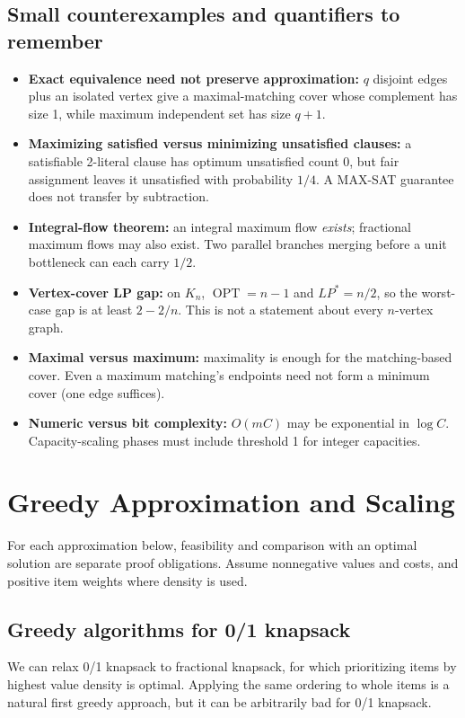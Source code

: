\documentclass[10pt]{article}
\theoremstyle{definition}
\newcommand{\OPT}{\operatorname{OPT}}
\begin{document}
\subsection{Small counterexamples and quantifiers to remember}
\begin{itemize}
\item \textbf{Exact equivalence need not preserve approximation:} $q$ disjoint edges plus
an isolated vertex give a maximal-matching cover whose complement has size 1, while
maximum independent set has size $q+1$.
\item \textbf{Maximizing satisfied versus minimizing unsatisfied clauses:} a satisfiable
2-literal clause has optimum unsatisfied count 0, but fair assignment leaves it unsatisfied
with probability $1/4$. A MAX-SAT guarantee does not transfer by subtraction.
\item \textbf{Integral-flow theorem:} an integral maximum flow \emph{exists}; fractional
maximum flows may also exist. Two parallel branches merging before a unit bottleneck can
each carry $1/2$.
\item \textbf{Vertex-cover LP gap:} on $K_n$, $\OPT=n-1$ and $LP^*=n/2$, so the
worst-case gap is at least $2-2/n$. This is not a statement about every $n$-vertex graph.
\item \textbf{Maximal versus maximum:} maximality is enough for the matching-based cover.
Even a maximum matching's endpoints need not form a minimum cover (one edge suffices).
\item \textbf{Numeric versus bit complexity:} $O(mC)$ may be exponential in $\log C$.
Capacity-scaling phases must include threshold 1 for integer capacities.
\end{itemize}



\clearpage\section{Greedy Approximation and Scaling}\label{gre:main}
For each approximation below, feasibility and comparison with an optimal solution are separate proof obligations. Assume nonnegative values and costs, and positive item weights where density is used.

\subsection{Greedy algorithms for 0/1 knapsack}\label{gre:knapsack}
We can relax 0/1 knapsack to fractional knapsack, for which prioritizing items by highest value density is optimal. Applying the same ordering to whole items is a natural first greedy approach, but it can be arbitrarily bad for 0/1 knapsack.
\end{document}
